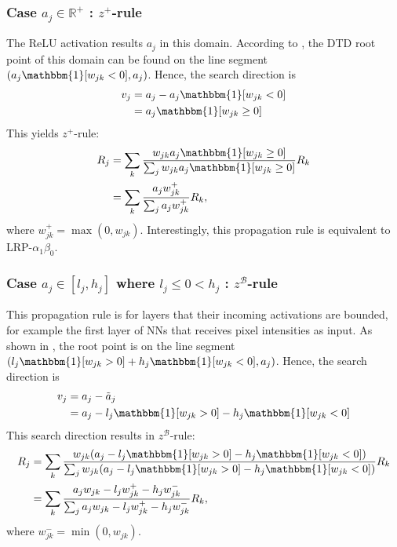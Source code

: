 \subsubsection{Case $a_j \in \mathbb{R}^+$ : $z^+$-rule}

The ReLU activation results $a_j$ in this domain. According to \addfigure{\ref{fig:dtd_zplus}}, the DTD root point of this domain can be found on the line segment  $( a_j \mathbbm{1}[ w_{jk}  < 0 ], a_j )$. Hence, the search direction is 
\begin{align*}
	v_j &= a_j - a_j \mathbbm{1}[ w_{jk}  < 0 ] \\
	&= a_j \mathbbm{1}[ w_{jk}  \ge 0 ]
\end{align*}
This yields $z^+$-rule:
\begin{align*}
		R_j &=	\sum_k \frac{ w_{jk} a_j \mathbbm{1}[w_{jk}  \ge 0 ]  }{\sum_{j} w_{jk} a_j \mathbbm{1}[ w_{jk}  \ge 0 ]}  R_k\\
		&=	\sum_k  \frac{ a_j  w_{jk}^+   }{\sum_{j}  a_j w_{jk}^+  }R_k,
\end{align*}
where $w_{jk}^+= \max(0, w_{jk})$. Interestingly, this propagation rule is equivalent to LRP-$\alpha_1\beta_0$. 


\subsubsection{Case $a_j \in [l_j , h_j]$ where $l_j \le 0 < h_j $ : $z^\mathcal{B}$-rule}

This propagation rule is for layers that their incoming activations are bounded, for example the first layer of NNs that receives pixel intensities as input. As shown in \addfigure{\ref{fig:dtd_zbeta}}, the root point is on the line segment $( l_j \mathbbm{1}[ w_{jk}  > 0 ]  + h_j \mathbbm{1}[ w_{jk}  < 0 ]  , a_j ) $. Hence,  the search direction is 
\begin{align*}
	v_j &= a_j - \tilde{a}_j \\
	&=a_j  - l_j \mathbbm{1}[ w_{jk}  > 0 ]  - h_j \mathbbm{1}[ w_{jk}  < 0 ]
\end{align*}
This search direction results in  $z^\mathcal{B}$-rule:
\begin{align*}
		R_j &=	\sum_k \frac{ w_{jk}  (a_j  - l_j \mathbbm{1}[ w_{jk}  > 0 ]  - h_j \mathbbm{1}[ w_{jk}  < 0 ]) }{\sum_{j} w_{jk}  (a_j  - l_j \mathbbm{1}[ w_{jk}  > 0 ] - h_j \mathbbm{1}[ w_{jk}  < 0 ]) }  R_k\\
		&=	\sum_k  \frac{ a_j  w_{jk} - l_j w_{jk}^+ - h_j w_{jk}^-  }{\sum_{j}   a_j  w_{jk} - l_j w_{jk}^+ - h_j w_{jk}^- }  R_k,
\end{align*}
where $w_{jk}^- = \min(0, w_{jk})$.


